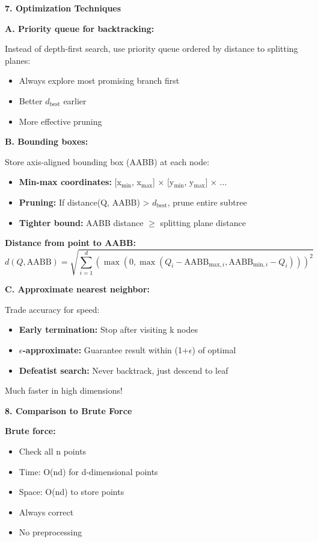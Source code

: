 \documentclass[12pt]{article}
\begin{document}
\begin{explanation}
\textbf{7. Optimization Techniques}

\textbf{A. Priority queue for backtracking:}

Instead of depth-first search, use priority queue ordered by distance to splitting planes:
\begin{itemize}
    \item Always explore most promising branch first
    \item Better $d_{\text{best}}$ earlier
    \item More effective pruning
\end{itemize}

\textbf{B. Bounding boxes:}

Store axis-aligned bounding box (AABB) at each node:
\begin{itemize}
    \item \textbf{Min-max coordinates:} [x$_{\min}$, x$_{\max}$] × [y$_{\min}$, y$_{\max}$] × ...
    \item \textbf{Pruning:} If distance(Q, AABB) > $d_{\text{best}}$, prune entire subtree
    \item \textbf{Tighter bound:} AABB distance $\geq$ splitting plane distance
\end{itemize}

\textbf{Distance from point to AABB:}
\[
d(Q, \text{AABB}) = \sqrt{\sum_{i=1}^{d} (\max(0, \max(Q_i - \text{AABB}_{\text{max},i}, \text{AABB}_{\text{min},i} - Q_i)))^2}
\]

\textbf{C. Approximate nearest neighbor:}

Trade accuracy for speed:
\begin{itemize}
    \item \textbf{Early termination:} Stop after visiting k nodes
    \item \textbf{$\epsilon$-approximate:} Guarantee result within (1+$\epsilon$) of optimal
    \item \textbf{Defeatist search:} Never backtrack, just descend to leaf
\end{itemize}

Much faster in high dimensions!

\textbf{8. Comparison to Brute Force}

\textbf{Brute force:}
\begin{itemize}
    \item Check all n points
    \item Time: O(nd) for d-dimensional points
    \item Space: O(nd) to store points
    \item Always correct
    \item No preprocessing
\end{itemize}


\end{explanation}
\end{document}
